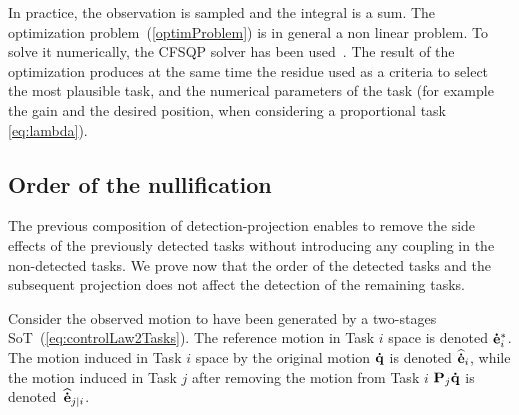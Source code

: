 \documentclass[journal]{IEEEtran}
\begin{document}

\medskip
In practice, the observation is sampled and the integral is a sum.
The optimization problem~(\ref{optimProblem}) is in general a non linear problem. To solve
it numerically, the CFSQP solver has been used~\cite{lawrence97}. The result of the optimization produces at the same time the residue used as a criteria to select the most plausible task, and the numerical parameters of the task (for example the gain and the desired position, when considering a proportional task \eqref{eq:lambda}).

%
%

\subsection{Order of the nullification}

The previous composition of detection-projection enables to remove the side effects of the previously detected tasks without introducing any coupling in the non-detected tasks. We prove now that the order of the detected tasks and the subsequent projection does not affect the detection of the remaining tasks.

Consider the observed motion to have been generated by a two-stages
SoT~(\ref{eq:controlLaw2Tasks}). The reference motion in Task $i$
space is denoted ${\mathbf{\dot{e}}}_{i}^*$. The motion induced in Task $i$ space by the
original motion ${\mathbf{\dot{q}}}$ is denoted ${\mathbf{\widehat{\dot{e}}}}_{i}$, while the motion induced in
Task $j$ after removing the motion from Task $i$ ${\mathbf{P}}_{j} {\mathbf{\dot{q}}}$ is denoted~${\mathbf{\widehat{\dot{e}}}}_{j|i}$.
\end{document}
